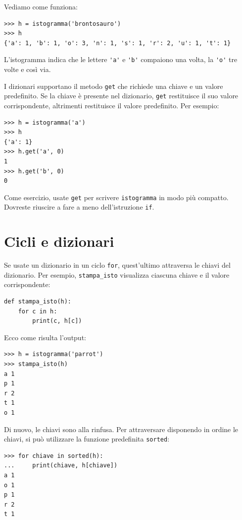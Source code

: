\documentclass[10pt]{book}
\begin{document}
Vediamo come funziona:

\begin{verbatim}
>>> h = istogramma('brontosauro')
>>> h
{'a': 1, 'b': 1, 'o': 3, 'n': 1, 's': 1, 'r': 2, 'u': 1, 't': 1}
\end{verbatim}
%
L'istogramma indica che le lettere \verb"'a'" e \verb"'b'"
compaiono una volta, la \verb"'o'" tre volte e così via.

I dizionari supportano il metodo {\tt get} che richiede una chiave e un valore predefinito. Se la chiave è presente nel dizionario, {\tt get} restituisce il suo valore corrispondente, altrimenti restituisce il valore predefinito. Per esempio:

\begin{verbatim}
>>> h = istogramma('a')
>>> h
{'a': 1}
>>> h.get('a', 0)
1
>>> h.get('b', 0)
0
\end{verbatim}
%
Come esercizio, usate {\tt get} per scrivere {\tt istogramma} in modo più compatto. Dovreste riuscire a fare a meno dell'istruzione {\tt if}.


\section{Cicli e dizionari}

Se usate un dizionario in un ciclo {\tt for}, quest'ultimo attraversa le chiavi del dizionario. Per esempio, \verb"stampa_isto" visualizza ciascuna chiave e il valore corrispondente:

\begin{verbatim}
def stampa_isto(h):
    for c in h:
        print(c, h[c])
\end{verbatim}
%
Ecco come risulta l'output:

\begin{verbatim}
>>> h = istogramma('parrot')
>>> stampa_isto(h)
a 1
p 1
r 2
t 1
o 1
\end{verbatim}
%
Di nuovo, le chiavi sono alla rinfusa. Per attraversare disponendo
in ordine le chiavi, si può utilizzare la funzione predefinita {\tt sorted}:

\begin{verbatim}
>>> for chiave in sorted(h):
...     print(chiave, h[chiave])
a 1
o 1
p 1
r 2
t 1
\end{verbatim}
\end{document}

